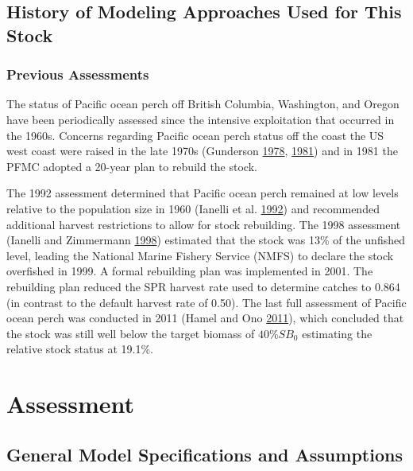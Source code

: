 \documentclass[12pt,]{article}
\begin{document}
\subsection{History of Modeling Approaches Used for This
Stock}\label{history-of-modeling-approaches-used-for-this-stock}

\subsubsection{Previous Assessments}\label{previous-assessments}

The status of Pacific ocean perch off British Columbia, Washington, and
Oregon have been periodically assessed since the intensive exploitation
that occurred in the 1960s. Concerns regarding Pacific ocean perch
status off the coast the US west coast were raised in the late 1970s
(Gunderson \protect\hyperlink{ref-gunderson_results_1978}{1978},
\protect\hyperlink{ref-gunderson_updated_1981}{1981}) and in 1981 the
PFMC adopted a 20-year plan to rebuild the stock.

The 1992 assessment determined that Pacific ocean perch remained at low
levels relative to the population size in 1960 (Ianelli et al.
\protect\hyperlink{ref-ianelli_status_1992}{1992}) and recommended
additional harvest restrictions to allow for stock rebuilding. The 1998
assessment (Ianelli and Zimmermann
\protect\hyperlink{ref-ianelli_status_1998}{1998}) estimated that the
stock was 13\% of the unfished level, leading the National Marine
Fishery Service (NMFS) to declare the stock overfished in 1999. A formal
rebuilding plan was implemented in 2001. The rebuilding plan reduced the
SPR harvest rate used to determine catches to 0.864 (in contrast to the
default harvest rate of 0.50). The last full assessment of Pacific ocean
perch was conducted in 2011 (Hamel and Ono
\protect\hyperlink{ref-hamel_stock_2011}{2011}), which concluded that
the stock was still well below the target biomass of \(40\%SB_{0}\)
estimating the relative stock status at 19.1\%.

\section{Assessment}\label{assessment}

\subsection{General Model Specifications and
Assumptions}\label{general-model-specifications-and-assumptions}
\end{document}
